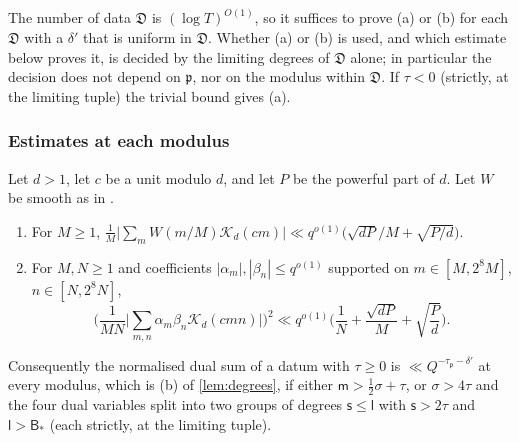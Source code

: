 \documentclass[11pt,colorlinks]{charlie}
\begin{document}
The number of data $\mathfrak D$ is $(\log T)^{O(1)}$, so it suffices to prove (a) or (b) for each $\mathfrak D$ with a $\delta'$ that is uniform in $\mathfrak D$. Whether (a) or (b) is used, and which estimate below proves it, is decided by the limiting degrees of $\mathfrak D$ alone; in particular the decision does not depend on $\mathfrak p$, nor on the modulus within $\mathfrak D$. If $\tau<0$ (strictly, at the limiting tuple) the trivial bound gives (a).

\subsubsection*{Estimates at each modulus}

\begin{lemma}\label{lem:unsignedplus}
Let $d>1$, let $c$ be a unit modulo $d$, and let $P$ be the powerful part of $d$. Let $W$ be smooth as in .
\begin{enumerate}[label=\textup{(\roman*)}]
\item For $M\ge1$, $\frac1M\big|\sum_mW(m/M)\mathscr K_d(cm)\big|\ll q^{o(1)}\big(\sqrt{dP}/M+\sqrt{P/d}\big)$.
\item For $M,N\ge1$ and coefficients $|\alpha_m|,|\beta_n|\le q^{o(1)}$ supported on $m\in[M,2^8M]$, $n\in[N,2^8N]$,
\[
 \Big(\frac1{MN}\Big|\sum_{m,n}\alpha_m\beta_n\mathscr K_d(cmn)\Big|\Big)^2\ll q^{o(1)}\Big(\frac1N+\frac{\sqrt{dP}}M+\sqrt{\frac Pd}\Big).
\]
\end{enumerate}
Consequently the normalised dual sum of a datum with $\tau\ge0$ is $\ll Q^{-\tau_{\mathfrak p}-\delta'}$ at every modulus, which is (b) of \cref{lem:degrees}, if either $\mathsf m>\frac12\sigma+\tau$, or $\sigma>4\tau$ and the four dual variables split into two groups of degrees $\mathsf s\le\mathsf l$ with $\mathsf s>2\tau$ and $\mathsf l>\mathsf B_*$ (each strictly, at the limiting tuple).
\end{lemma}
\end{document}
